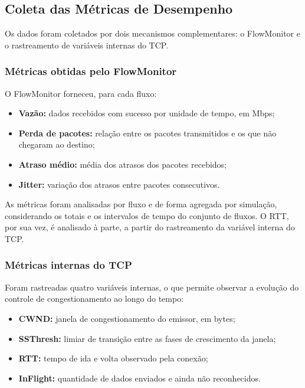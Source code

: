 \documentclass[a4paper,12pt]{monografia}
\begin{document}
\subsection{Coleta das Métricas de Desempenho}

Os dados foram coletados por dois mecanismos complementares: o FlowMonitor e o rastreamento de variáveis internas do TCP.

\subsubsection{Métricas obtidas pelo FlowMonitor}

O FlowMonitor forneceu, para cada fluxo:

\begin{itemize}
    \item \textbf{Vazão:} dados recebidos com sucesso por unidade de tempo, em Mbps;
    \item \textbf{Perda de pacotes:} relação entre os pacotes transmitidos e os que não chegaram ao destino;
    \item \textbf{Atraso médio:} média dos atrasos dos pacotes recebidos;
    \item \textbf{Jitter:} variação dos atrasos entre pacotes consecutivos.
\end{itemize}

As métricas foram analisadas por fluxo e de forma agregada por simulação, considerando os totais e os intervalos de tempo do conjunto de fluxos. O RTT, por sua vez, é analisado à parte, a partir do rastreamento da variável interna do TCP.

\subsubsection{Métricas internas do TCP}

Foram rastreadas quatro variáveis internas, o que permite observar a evolução do controle de congestionamento ao longo do tempo:

\begin{itemize}
    \item \textbf{CWND:} janela de congestionamento do emissor, em bytes;
    \item \textbf{SSThresh:} limiar de transição entre as fases de crescimento da janela;
    \item \textbf{RTT:} tempo de ida e volta observado pela conexão;
    \item \textbf{InFlight:} quantidade de dados enviados e ainda não reconhecidos.
\end{itemize}
\end{document}
